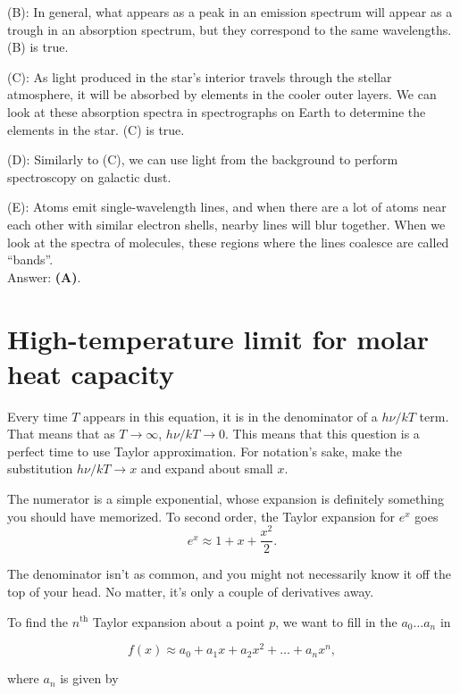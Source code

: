 \documentclass[11pt]{paper}
\newcommand{\answer}[1]{Answer: \textbf{(#1)}.}
\begin{document}
(B):  In general, what appears as a peak in an emission spectrum will appear as a trough in an absorption spectrum, but they correspond to the same wavelengths.  (B) is true.

(C):  As light produced in the star's interior travels through the stellar atmosphere, it will be absorbed by elements in the cooler outer layers.  We can look at these absorption spectra in spectrographs on Earth to determine the elements in the star.  (C) is true.

(D):  Similarly to (C), we can use light from the background to perform spectroscopy on galactic dust.

(E):  Atoms emit single-wavelength lines, and when there are a lot of atoms near each other with similar electron shells, nearby lines will blur together.  When we look at the spectra of molecules, these regions where the lines coalesce are called ``bands''.\\

\answer{A}

\section{High-temperature limit for molar heat capacity}

Every time $T$ appears in this equation, it is in the denominator of a $h\nu/kT$ term.  That means that as $T\rightarrow \infty$, $h\nu/kT\rightarrow0$.  This means that this question is a perfect time to use Taylor approximation.  For notation's sake, make the substitution $h\nu/kT\rightarrow x$ and expand about small $x$.

The numerator is a simple exponential, whose expansion is definitely something you should have memorized.  To second order, the Taylor expansion for $e^x$ goes
\begin{equation}
e^x \approx 1 + x + \frac{x^2}{2}.
\end{equation}

The denominator isn't as common, and you might not necessarily know it off the top of your head.  No matter, it's only a couple of derivatives away.

To find the $n^\text{th}$ Taylor expansion about a point $p$, we want to fill in the $a_0 \dots a_n$ in

\begin{equation}
f(x) \approx a_0 + a_1x + a_2x^2 + \dots + a_nx^n,
\end{equation}

where $a_n$ is given by
\end{document}
